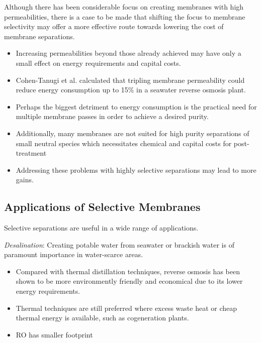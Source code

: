   Although there has been considerable focus on creating membranes with high
  permeabilities, there is a case to be made that shifting the focus to membrane
  selectivity may offer a more effective route towards lowering the cost of 
  membrane separations.
  \begin{itemize}
    \item Increasing permeabilities beyond those already achieved may have 
    only a small effect on energy requirements and capital costs. 
    \item Cohen-Tanugi et al. calculated that tripling membrane permeability
    could reduce energy consumption up to 15\% in a seawater reverse osmosis plant.~\cite{cohen-tanugi_quantifying_2014}
    \item Perhaps the biggest detriment to energy consumption is the practical
	need for multiple membrane passes in order to achieve a desired purity.
    \item Additionally, many membranes are not suited for high purity separations
    of small neutral species which necessitates chemical and capital costs for
    post-treatment
    \item Addressing these problems with highly selective separations may lead to 
    more gains.
  \end{itemize} 
  
  
  \subsection{Applications of Selective Membranes}
  
  Selective separations are useful in a wide range of applications.  
  
  \textit{Desalination}:
  Creating potable water from seawater or brackish water is of paramount importance
  in water-scarce areas. 
  \begin{itemize}
  	\item Compared with thermal distillation techniques, reverse osmosis has been 
  	shown to be more environmently friendly and economical due to its lower energy
  	requirements.\cite{morton_environmental_1996}
  	\item Thermal techniques are still preferred where excess waste heat or cheap 
  	thermal energy is available, such as cogeneration plants.\cite{bhojwani_technology_2019}
  	\item RO has smaller footprint %
  \end{itemize}

